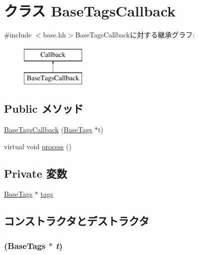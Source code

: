 \hypertarget{classBaseTagsCallback}{
\section{クラス BaseTagsCallback}
\label{classBaseTagsCallback}
}


{\ttfamily \#include $<$base.hh$>$}BaseTagsCallbackに対する継承グラフ:\begin{figure}[H]
\begin{center}
\leavevmode
\includegraphics[height=2cm]{classBaseTagsCallback}
\end{center}
\end{figure}
\subsection*{Public メソッド}
\begin{DoxyCompactItemize}
\item 
\hyperlink{classBaseTagsCallback_a1f80d10a956d939dc9415b1d636d245f}{BaseTagsCallback} (\hyperlink{classBaseTags}{BaseTags} $\ast$t)
\item 
virtual void \hyperlink{classBaseTagsCallback_a6780fc1879338e1ff38faf7279ec6a0b}{process} ()
\end{DoxyCompactItemize}
\subsection*{Private 変数}
\begin{DoxyCompactItemize}
\item 
\hyperlink{classBaseTags}{BaseTags} $\ast$ \hyperlink{classBaseTagsCallback_a6819886aaca345d2e681ba3ef01f96c4}{tags}
\end{DoxyCompactItemize}


\subsection{コンストラクタとデストラクタ}
\hypertarget{classBaseTagsCallback_a1f80d10a956d939dc9415b1d636d245f}{
\subsubsection[{BaseTagsCallback}]{ ({\bf BaseTags} $\ast$ {\em t})}}
\label{classBaseTagsCallback_a1f80d10a956d939dc9415b1d636d245f}



